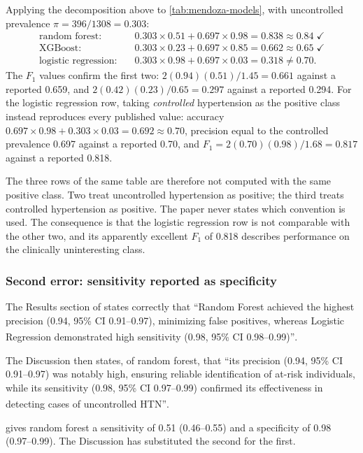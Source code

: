 \documentclass[12pt,a4paper,oneside]{report}
\newcommand{\bq}[1]{``#1''\textsuperscript{\dag}}
\begin{document}
Applying the decomposition above to \cref{tab:mendoza-models}, with uncontrolled prevalence $\pi = 396/1308 = 0.303$:
\begin{align}
  \text{random forest:}\quad & 0.303 \times 0.51 + 0.697 \times 0.98 = 0.838 \approx 0.84 \;\checkmark\\
  \text{XGBoost:}\quad & 0.303 \times 0.23 + 0.697 \times 0.85 = 0.662 \approx 0.65 \;\checkmark\\
  \text{logistic regression:}\quad & 0.303 \times 0.98 + 0.697 \times 0.03 = 0.318 \neq 0.70.
\end{align}
The $F_1$ values confirm the first two: $2(0.94)(0.51)/1.45 = 0.661$ against a reported 0.659, and $2(0.42)(0.23)/0.65 = 0.297$ against a reported 0.294. For the logistic regression row, taking \emph{controlled} hypertension as the positive class instead reproduces every published value: accuracy $0.697 \times 0.98 + 0.303 \times 0.03 = 0.692 \approx 0.70$, precision equal to the controlled prevalence 0.697 against a reported 0.70, and $F_1 = 2(0.70)(0.98)/1.68 = 0.817$ against a reported 0.818.

The three rows of the same table are therefore not computed with the same positive class. Two treat uncontrolled hypertension as positive; the third treats controlled hypertension as positive. The paper never states which convention is used. The consequence is that the logistic regression row is not comparable with the other two, and its apparently excellent $F_1$ of 0.818 describes performance on the clinically uninteresting class.

\subsubsection{Second error: sensitivity reported as specificity}\label{sec:sens-spec}

The Results section of \textcite{mendoza2025} states correctly that \bq{Random Forest achieved the highest precision (0.94, 95\% CI 0.91--0.97), minimizing false positives, whereas Logistic Regression demonstrated high sensitivity (0.98, 95\% CI 0.98--0.99)}.

The Discussion then states, of random forest, that \bq{its precision (0.94, 95\% CI 0.91--0.97) was notably high, ensuring reliable identification of at-risk individuals, while its sensitivity (0.98, 95\% CI 0.97--0.99) confirmed its effectiveness in detecting cases of uncontrolled HTN}.

 gives random forest a sensitivity of 0.51 (0.46--0.55) and a specificity of 0.98 (0.97--0.99). The Discussion has substituted the second for the first.
\end{document}
